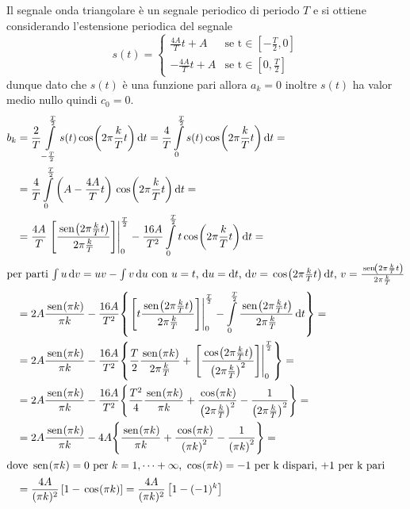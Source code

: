 \begin{esercizio}
Il segnale onda triangolare è un segnale periodico di periodo $T$ e si ottiene considerando l'estensione periodica del segnale
\begin{equation*}
s(t)=\begin{cases}
	\frac{4 A}{T}t+A & \text{se t} \in \left[-\frac{T}{2},0\right] \\
	-\frac{4 A}{T}t+A & \text{se t} \in \left[0,\frac{T}{2}\right]
	\end{cases}
\end{equation*}
dunque dato che $s(t)$ è una funzione pari allora $a_k=0$ inoltre $s(t)$ ha valor medio nullo quindi $c_0=0$.
\begin{align*}
	b_k&=\frac{2}{T}\intd{-\frac{T}{2}}{\frac{T}{2}}{s(t)\cos{2\pi\frac{k}{T}t}}{t}=\frac{4}{T}\intd{0}{\frac{T}{2}}{s(t)\cos{2\pi\frac{k}{T}t}}{t}=\\
	&=\frac{4}{T}\intd{0}{\frac{T}{2}}{\left(A-\frac{4 A}{T}t\right)\cos{2\pi\frac{k}{T}t}}{t}=\\
	&=\frac{4A}{T}\bound{0}{\frac{T}{2}}{\frac{\sen{2\pi\frac{k}{T}t}}{2\pi\frac{k}{T}}} -\frac{16A}{T^2}\intd{0}{\frac{T}{2}}{t\cos{2\pi\frac{k}{T}t}}{t}=\\
	\intertext{per parti $\int u\diff v= u v-\int v\diff u$ con $u=t$, $\diff u=\diff t$, $\diff v=\cos{2\pi\frac{k}{T}t}\diff t$, $v=\frac{\sen{2\pi\frac{k}{T}t}}{2\pi\frac{k}{T}}$}
	&=2A \frac{\sen{\pi k}}{\pi k}-\frac{16A}{T^2}{\left\lbrace \bound{0}{\frac{T}{2}}{t\frac{\sen{2\pi\frac{k}{T}t}}{2\pi\frac{k}{T}}}-\intd{0}{\frac{T}{2}}{\frac{\sen{2\pi\frac{k}{T}t}}{2\pi\frac{k}{T}}}{t}\right\rbrace}=\\
	&=2A \frac{\sen{\pi k}}{\pi k}-\frac{16A}{T^2}{\left\lbrace\frac{T}{2}\frac{\sen{\pi k}}{2\pi\frac{k}{T}}+\bound{0}{\frac{T}{2}}{\frac{\cos{2\pi\frac{k}{T}t}}{\left(2\pi\frac{k}{T}\right)^2}}\right\rbrace}=\\
	&=2A \frac{\sen{\pi k}}{\pi k}-\frac{16A}{T^2}{\left\lbrace\frac{T^2}{4}\frac{\sen{\pi k}}{\pi k}+\frac{\cos{\pi k}}{\left(2\pi\frac{k}{T}\right)^2}-\frac{1}{\left(2\pi\frac{k}{T}\right)^2}\right\rbrace}=\\
	&=2A \frac{\sen{\pi k}}{\pi k}-4A{\left\lbrace\frac{\sen{\pi k}}{\pi k}+\frac{\cos{\pi k}}{\left(\pi k\right)^2}-\frac{1}{\left(\pi k\right)^2}\right\rbrace}=\\
	\intertext{dove $\sen{\pi k}=0$ per $k=1,\dots+\infty$, $\cos{\pi k}=-1$ per k dispari, $+1$ per k pari}
	&=\frac{4A}{(\pi k)^2}\left[1-\cos{\pi k}\right]=\frac{4A}{(\pi k)^2}\left[1-(-1)^k\right]
\end{align*}
\end{esercizio}

